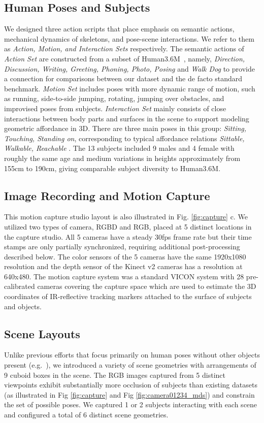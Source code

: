 \documentclass[times,referee,twocolumn,final,authoryear]{elsarticle}
\begin{document}
\subsection{Human Poses and Subjects}
We designed three action scripts that place emphasis on semantic actions, 
mechanical dynamics of skeletons, and pose-scene interactions.
We refer to them as \textit{Action, Motion, and Interaction Sets} respectively.
The semantic actions of \textit{Action Set} are constructed from a subset
of Human3.6M~\citep{h36m_pami}, namely, \textit{Direction, Discussion, Writing,
Greeting, Phoning, Photo, Posing} and \textit{Walk Dog} to provide a connection
for comparisons between our dataset and the de facto standard benchmark.
\textit{Motion Set} includes poses with more dynamic range of motion, such as
running, side-to-side jumping, rotating, jumping over obstacles, and improvised poses
from subjects.
\textit{Interaction Set} mainly consists of close interactions between body 
parts and surfaces in the scene to support modeling geometric affordance in 3D.
There are three main poses in this group: \textit{Sitting, Touching, Standing on},
corresponding to typical affordance relations \textit{Sittable, Walkable, Reachable}
\citep{Fouhey12,Guptaafford}.
The 13 subjects included 9 males and 4 female with roughly the same age and
medium variations in heights approximately from 155cm to 190cm, giving comparable
subject diversity to Human3.6M.

\subsection{Image Recording and Motion Capture} 
This motion capture studio layout is also illustrated in Fig. \ref{fig:capture} c.
We utilized two types of camera, RGBD and RGB, placed at 5 distinct locations in the 
capture studio. All 5 cameras have a steady 30fps frame rate but their time stamps 
are only partially synchronized, requiring additional post-processing described below.  
The color sensors of the 5 cameras have the same 1920x1080 resolution and the depth
sensor of the Kinect v2 cameras has a resolution at 640x480.  The motion capture system 
was a standard VICON system with 28 pre-calibrated cameras covering the capture space which are used to
estimate the 3D coordinates of IR-reflective tracking markers attached to the surface 
of subjects and objects. 


\subsection{Scene Layouts}
Unlike previous efforts that focus primarily on human poses without other objects present
(e.g.~\citep{h36m_pami,mono_3dhp2017}), we introduced a variety of scene geometries
with arrangements of 9 cuboid boxes in the scene. The RGB images captured from
5 distinct viewpoints exhibit substantially more occlusion of subjects than existing 
datasets (as illustrated in Fig  \ref{fig:capture} and Fig \ref{fig:camera01234_mds})
and constrain the set of possible poses. We captured 1 or 2 subjects interacting with 
each scene and configured a total of 6 distinct scene geometries.
\end{document}
